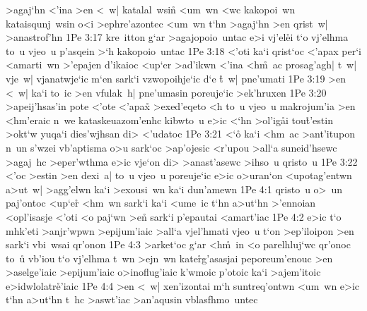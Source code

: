 >agaj`hn
<'ina
>en
<~w|
katalal~wsin\r{}
<um~wn
<wc
kakopoi~wn
kataisqunj~wsin
o<i
>ephre'azontec
<um~wn
t`hn
>agaj`hn
>en
qrist~w|
>anastrof'hn\bibvsend
\vs 1Pe 3:17
kre~itton
g`ar
>agajopoio~untac
e>i
vj'el\r{e}i
t`o
vj'elhma
to~u
vjeo~u
p'asqein
>`h
kakopoio~untac\bibvsend
\vs 1Pe 3:18
<'oti
ka`i
qrist`oc
<'apax
per`i
<amarti~wn
>'epajen
d'ikaioc
<up`er
>ad'ikwn
<'ina
<h\r{m}~ac
prosag'agh|
t~w|
vje~w|
vjanatwje`ic
m`en
sark`i
vzwopoihje`ic
d`e
\r{t}~w|
pne'umati\bibvsend
\vs 1Pe 3:19
>en
<~w|
ka`i
to~ic
>en
vfulak~h|
pne'umasin
poreuje`ic
>ek'hruxen\bibvsend
\vs 1Pe 3:20
>apeij'hsas'in
pote
<'ote
<'apax\r{}
>exed'eqeto
<h
to~u
vjeo~u
makrojum'ia
>en
<hm'eraic
n~we
kataskeuazom'enhc
kibwto~u
e>ic
<`hn
>ol'ig\r{a}i
tou\r{t}'estin
>okt`w
yuqa`i
dies'wjhsan
di>
<'udatoc\bibvsend
\vs 1Pe 3:21
<`o\r{}
ka`i
<hm~ac
>ant'itupon
n~un
s'wzei
vb'aptisma
o>u
sark`oc
>ap'ojesic
<r'upou
>all`a
suneid'hsewc
>agaj~hc
>eper'wthma
e>ic
vje`on
di>
>anast'asewc
>ihso~u
qristo~u\bibvsend
\vs 1Pe 3:22
<'oc
>estin
>en
dexi~a|
to~u
vjeo~u
poreuje`ic
e>ic
o>uran`on
<upotag'entwn
a>ut~w|
>agg'elwn
ka`i
>exousi~wn
ka`i
dun'amewn\bibvsend
\vs 1Pe 4:1
qristo~u
o>~un
paj'ontoc
<up`er\r{}
<hm~wn
sark`i
ka`i
<ume~ic
t`hn
a>ut`hn
>'ennoian
<opl'isasje
<'oti
<o
paj`wn
>e\r{n}
sark`i
p'epautai
<amart'iac\bibvsend
\vs 1Pe 4:2
e>ic
t`o
mhk'eti
>anjr'wpwn
>epijum'iaic
>all`a
vjel'hmati
vjeo~u
t`on
>ep'iloipon
>en
sark`i
vbi~wsai
qr'onon\bibvsend
\vs 1Pe 4:3
>arket`oc
g`ar
<h\r{m}~in
<o
parelhluj`wc
qr'onoc
to~u\r{}
vb'iou
t`o
vj'elhma
t~wn
>ejn~wn
kate\r{r}g'a\-sas\-jai
peporeum'enouc
>en
>aselge'iaic
>epijum'iaic
o>inoflug'iaic
k'wmoic
p'otoic
ka`i
>ajem'itoic
e>idwlolatr\r{e}'iaic\bibvsend
{}
\vs 1Pe 4:4
>en
<~w|
xen'izontai
m`h
suntreq'ontwn
<um~wn
e>ic
t`hn
a>ut`hn
t~hc
>aswt'iac
>an'aqusin
vblasfhmo~untec\bibvsend
